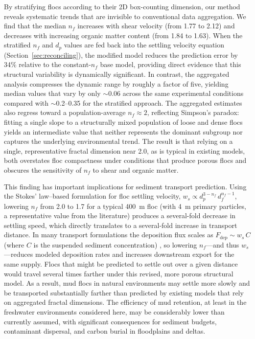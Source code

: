 \documentclass{agujournal2019}
\begin{document}
By stratifying flocs according to their 2D box-counting dimension, our method reveals systematic trends that are invisible to conventional data aggregation. We find that the median $n_f$ increases with shear velocity (from 1.77 to 2.12) and decreases with increasing organic matter content (from 1.84 to 1.63). When the stratified $n_f$ and $d_p$ values are fed back into the settling velocity equation (Section~\ref{sec:reconciling}), the modified model reduces the prediction error by 34\% relative to the constant-$n_f$ base model, providing direct evidence that this structural variability is dynamically significant. In contrast, the aggregated analysis compresses the dynamic range by roughly a factor of five, yielding median values that vary by only $\sim$0.06 across the same experimental conditions compared with $\sim$0.2--0.35 for the stratified approach. The aggregated estimates also regress toward a population-average $n_f \approx 2$, reflecting Simpson’s paradox: fitting a single slope to a structurally mixed population of loose and dense flocs yields an intermediate value that neither represents the dominant subgroup nor captures the underlying environmental trend. The result is that relying on a single, representative fractal dimension near 2.0, as is typical in existing models, both overstates floc compactness under conditions that produce porous flocs and obscures the sensitivity of $n_f$ to shear and organic matter. 

This finding has important implications for sediment transport prediction. Using the Stokes' law--based formulation for floc settling velocity, $w_s \propto d_p^{3-n_f}\, d_f^{n_f-1}$, lowering $n_f$ from 2.0 to 1.7 for a typical 400~\textmu m floc (with 4~\textmu m primary particles, a representative value from the literature) produces a several-fold decrease in settling speed, which directly translates to a several-fold increase in transport distance. In many transport formulations the deposition flux scales as $F_\text{dep} \sim w_s\, C$ (where $C$ is the suspended sediment concentration) \cite{amoudry2008review}, so lowering $n_f$---and thus $w_s$---reduces modeled deposition rates and increases downstream export for the same supply. Flocs that might be predicted to settle out over a given distance would travel several times farther under this revised, more porous structural model. As a result, mud flocs in natural environments may settle more slowly and be transported substantially farther than predicted by existing models that rely on aggregated fractal dimensions. The efficiency of mud retention, at least in the freshwater environments considered here, may be considerably lower than currently assumed, with significant consequences for sediment budgets, contaminant dispersal, and carbon burial in floodplains and deltas.
\end{document}
